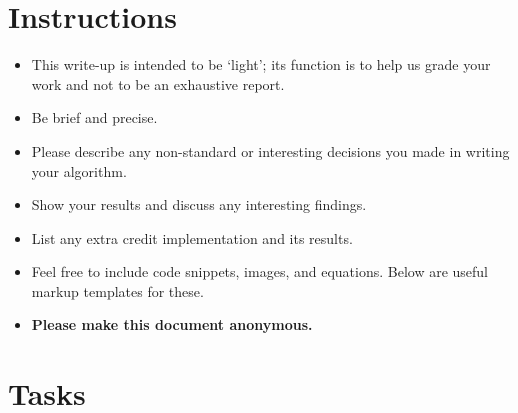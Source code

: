 \section*{Instructions}

\begin{itemize}
  \item This write-up is intended to be `light'; its function is to help us grade your work and not to be an exhaustive report.
  \item Be brief and precise.
  \item Please describe any non-standard or interesting decisions you made in writing your algorithm.
  \item Show your results and discuss any interesting findings.
  \item List any extra credit implementation and its results.
  \item Feel free to include code snippets, images, and equations. Below are useful markup templates for these.
  \item \textbf{Please make this document anonymous.}
\end{itemize}

\section*{Tasks}

